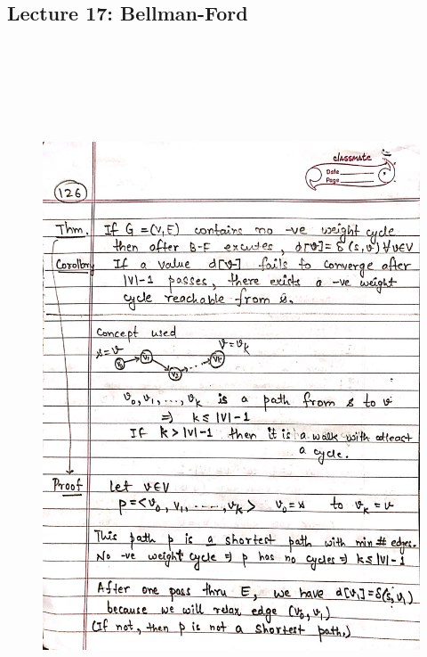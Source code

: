 \newpage
{\color{black} \subsection*{Lecture 17: Bellman-Ford}}
\begin{figure}[H]
    \centering
    \includegraphics[width=16cm, height=21cm]{"./MIT-6.006/MIT-6006-126"}
\end{figure}

